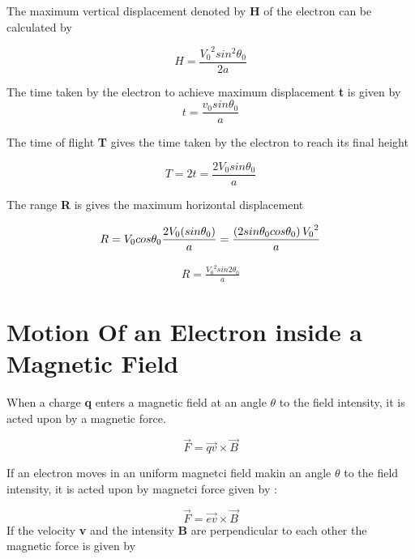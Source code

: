 \documentclass[a4paper,20pt,twoside]{report}
\begin{document}
	\vspace{10mm}
	
	
	The maximum vertical displacement denoted by \textbf{H} of the electron can be calculated by 
	
	\begin{equation}
	H = \frac{{V_0}^2sin^2\theta_0}{2a}
	\end{equation}
	
	The time taken by the electron to achieve maximum displacement \textbf{t}
	is given by
	\begin{equation}
	t = \frac{v_0sin\theta_0}{a}
	\end{equation}
	
	The time of flight \textbf{T} gives the time taken by the electron
	to reach its final height
	
	\begin{equation}
	T = 2t = \frac{2V_0sin\theta_0}{a}
	\end{equation}
	
	
	The range \textbf{R} is gives the maximum horizontal displacement 
	
	\begin{equation}
	R = V_0 cos \theta_0\frac{2V_0(sin\theta_0)}{a}\\
	= \frac{\left(2sin\theta_0cos\theta_0\right){V_0}^2}{a}
	\end{equation}
	
	\begin{eqnarray}
	R = \frac{{V_0}^2 sin2\theta_0}{a}
	\end{eqnarray}
	
	\section{Motion Of an Electron inside a Magnetic Field}
	
	When a charge \textbf{q} enters a magnetic field at an angle \textbf{$\theta$} to the field intensity,
	it is acted upon by a magnetic force.
	
	\begin{equation}
	\vec{F} = \vec{qv} \times \vec{B}
	\end{equation}
	
	If an electron moves in an uniform magnetci field makin an angle $\theta$ to the field intensity, it is acted upon by magnetci force given by : 
	
	\begin{equation}
	\vec{F} = \vec{ev} \times \vec{B}
	\end{equation}
	If the velocity \textbf{v} and the intensity \textbf{B} are perpendicular to each other the magnetic
	force is given by 
	
\end{document}
